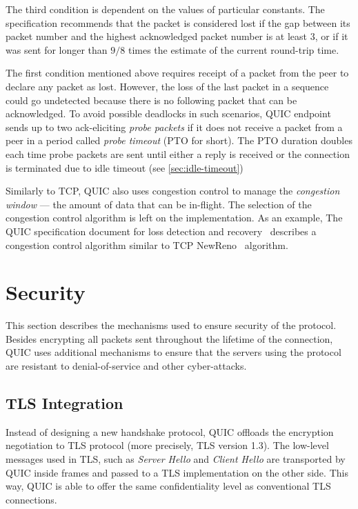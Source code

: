 The third condition is dependent on the values of particular constants. The specification recommends
that the packet is considered lost if the gap between its packet number and the highest acknowledged
packet number is at least 3, or if it was sent for longer than $9/8$ times the estimate of the
current round-trip time.

The first condition mentioned above requires receipt of a packet from the peer to declare any packet
as lost. However, the loss of the last packet in a sequence could go undetected because there is no
following packet that can be acknowledged. To avoid possible deadlocks in such scenarios, QUIC
endpoint sends up to two ack-eliciting \textit{probe packets} if it does not receive a packet from a
peer in a period called \textit{probe timeout} (PTO for short). The PTO duration doubles each time
probe packets are sent until either a reply is received or the connection is terminated due to idle
timeout (see \autoref{sec:idle-timeout})

Similarly to TCP, QUIC also uses congestion control to manage the \textit{congestion window} --- the
amount of data that can be in-flight. The selection of the congestion control algorithm is left on
the implementation. As an example, The QUIC specification document for loss detection and recovery~\cite[Section~7]{draft-ietf-quic-recovery} describes a congestion control algorithm similar to TCP NewReno~\cite{rfc6582} algorithm.

\section{Security}

This section describes the mechanisms used to ensure security of the protocol. Besides encrypting
all packets sent throughout the lifetime of the connection, QUIC uses additional mechanisms to
ensure that the servers using the protocol are resistant to denial-of-service and other
cyber-attacks.

\subsection{TLS Integration}

Instead of designing a new handshake protocol, QUIC offloads the encryption negotiation to TLS
protocol (more precisely, TLS version 1.3). The low-level messages used in TLS, such as
\textit{Server Hello} and \textit{Client Hello} are transported by QUIC inside \CRYPTO{} frames and
passed to a TLS implementation on the other side. This way, QUIC is able to offer the same
confidentiality level as conventional TLS connections.

